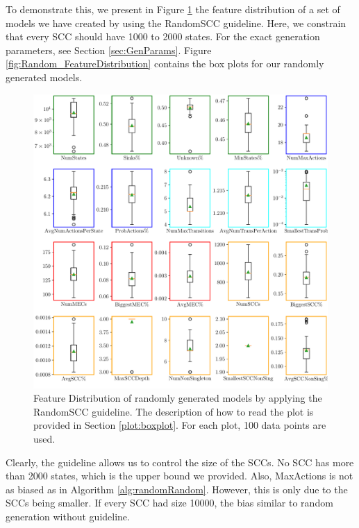To demonstrate this, we present in Figure \ref{fig:RandomSCC_FeatureDistributions} the feature distribution of a set of models we have created by using the RandomSCC guideline.
Here, we constrain that every SCC should have 1000 to 2000 states. For the exact generation parameters, see Section \ref{sec:GenParams}.
Figure \ref{fig:Random_FeatureDistribution} contains the box plots for our randomly generated models.
\begin{figure}[h!]
    \centering
    \includegraphics[width=1\textwidth]{figures/RandomSCC_FeatureDistribution.pdf}
    \caption[Feature Distribution of randomly generated models with the RandomSCC guideline]{
        Feature Distribution of randomly generated models by applying the RandomSCC guideline. The description of how to read the plot is provided in Section \ref{plot:boxplot}.
        For each plot, 100 data points are used.
    }
    \label{fig:RandomSCC_FeatureDistributions}
\end{figure}
\FloatBarrier

\label{insights:sccDistribution}
Clearly, the guideline allows us to control the size of the SCCs. No SCC has more than 2000 states, which is the upper bound we provided.
Also, MaxActions is not as biased as in Algorithm \ref{alg:randomRandom}. However, this is only due to the SCCs being smaller.
If every SCC had size 10000, the bias similar to random generation without guideline.

